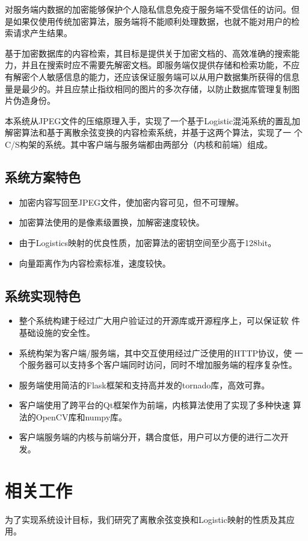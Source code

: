 对服务端内数据的加密能够保护个人隐私信息免疫于服务端不受信任的访问。但
是如果仅使用传统加密算法，服务端将不能顺利处理数据，也就不能对用户的检
索请求产生结果。

基于加密数据库的内容检索，其目标是提供关于加密文档的、高效准确的搜索能
力，并且在搜索时应不需要先解密文档。即服务端仅提供存储和检索功能，不应
有解密个人敏感信息的能力，还应该保证服务端可以从用户数据集所获得的信息
量是最少的。并且应禁止指纹相同的图片的多次存储，以防止数据库管理复制图
片伪造身份。

本系统从JPEG文件的压缩原理入手，实现了一个基于Logistic混沌系统的置乱加
解密算法和基于离散余弦变换的内容检索系统，并基于这两个算法，实现了一
个C/S构架的系统。其中客户端与服务端都由两部分（内核和前端）组成。

\subsection{系统方案特色}
\label{sec:sys-design-spec}
\begin{itemize}
\item 加密内容写回至JPEG文件，使加密内容可见，但不可理解。
\item 加密算法使用的是像素级置换，加解密速度较快。
\item 由于Logistics映射的优良性质\cite{li2011}，加密算法的密钥空间至少高于128bit。
\item 向量距离作为内容检索标准，速度较快。
\end{itemize}

\subsection{系统实现特色}
\label{sec:sys-impl-spec}
\begin{itemize}
\item 整个系统构建于经过广大用户验证过的开源库或开源程序上，可以保证软
件基础设施的安全性。
\item 系统构架为客户端/服务端，其中交互使用经过广泛使用的HTTP协议，使
一个服务器可以支持多个客户端同时访问，同时不增加服务端的程序复杂性。
\item 服务端使用简洁的Flask框架和支持高并发的tornado库，高效可靠。
\item 客户端使用了跨平台的Qt框架作为前端，内核算法使用了实现了多种快速
算法的OpenCV库和numpy库。
\item 客户端服务端的内核与前端分开，耦合度低，用户可以方便的进行二次开
发。
\end{itemize}

\section{相关工作}
\label{sec:related-work}
为了实现系统设计目标，我们研究了离散余弦变换和Logistic映射的性质及其应用。

